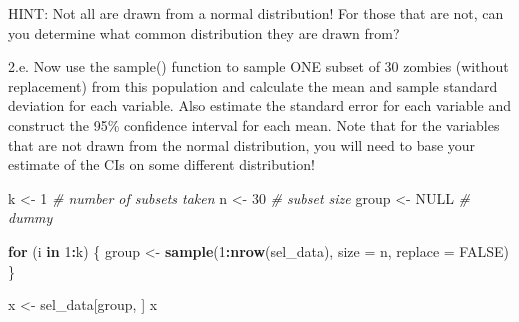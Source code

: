 \documentclass[]{article}
\newenvironment{Shaded}{\begin{snugshade}}{\end{snugshade}}
\newcommand{\KeywordTok}[1]{\textcolor[rgb]{0.13,0.29,0.53}{\textbf{#1}}}
\newcommand{\DataTypeTok}[1]{\textcolor[rgb]{0.13,0.29,0.53}{#1}}
\newcommand{\DecValTok}[1]{\textcolor[rgb]{0.00,0.00,0.81}{#1}}
\newcommand{\StringTok}[1]{\textcolor[rgb]{0.31,0.60,0.02}{#1}}
\newcommand{\CommentTok}[1]{\textcolor[rgb]{0.56,0.35,0.01}{\textit{#1}}}
\newcommand{\OtherTok}[1]{\textcolor[rgb]{0.56,0.35,0.01}{#1}}
\newcommand{\ControlFlowTok}[1]{\textcolor[rgb]{0.13,0.29,0.53}{\textbf{#1}}}
\newcommand{\OperatorTok}[1]{\textcolor[rgb]{0.81,0.36,0.00}{\textbf{#1}}}
\newcommand{\NormalTok}[1]{#1}
\begin{document}
HINT: Not all are drawn from a normal distribution! For those that are
not, can you determine what common distribution they are drawn from?

2.e. Now use the sample() function to sample ONE subset of 30 zombies
(without replacement) from this population and calculate the mean and
sample standard deviation for each variable. Also estimate the standard
error for each variable and construct the 95\% confidence interval for
each mean. Note that for the variables that are not drawn from the
normal distribution, you will need to base your estimate of the CIs on
some different distribution!

\begin{Shaded}
\begin{Highlighting}[]
\NormalTok{k <-}\StringTok{ }\DecValTok{1}  \CommentTok{# number of subsets taken}
\NormalTok{n <-}\StringTok{ }\DecValTok{30}  \CommentTok{# subset size}
\NormalTok{group <-}\StringTok{ }\OtherTok{NULL}  \CommentTok{# dummy}

\ControlFlowTok{for}\NormalTok{ (i }\ControlFlowTok{in} \DecValTok{1}\OperatorTok{:}\NormalTok{k) \{}
\NormalTok{  group <-}\StringTok{ }\KeywordTok{sample}\NormalTok{(}\DecValTok{1}\OperatorTok{:}\KeywordTok{nrow}\NormalTok{(sel_data), }\DataTypeTok{size =}\NormalTok{ n, }\DataTypeTok{replace =} \OtherTok{FALSE}\NormalTok{)}
\NormalTok{\}}

\NormalTok{x <-}\StringTok{ }\NormalTok{sel_data[group, ]}
\NormalTok{x}
\end{Highlighting}
\end{Shaded}
\end{document}
